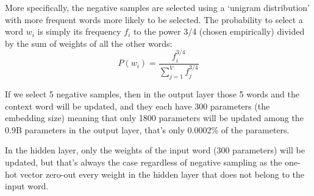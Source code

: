 More specifically, the negative samples are selected using a `unigram distribution' with more frequent words more likely to be selected. The probability to select a word $w_i$ is simply its frequency $f_i$ to the power 3/4 (chosen empirically) divided by the sum of weights of all the other words:
\begin{equation}
P(w_i) = \frac{f_i^{3/4}}{\sum_{j=1}^V f_j^{3/4}}
\end{equation}

If we select 5 negative samples, then in the output layer those 5 words and the context word will be updated, and they each have 300 parameters (the embedding size) meaning that only 1800 parameters will be updated among the 0.9B parameters in the output layer, that's only 0.0002\% of the parameters.

In the hidden layer, only the weights of the input word (300 parameters) will be updated, but that's always the case regardless of negative sampling as the one-hot vector zero-out every weight in the hidden layer that does not belong to the input word.






